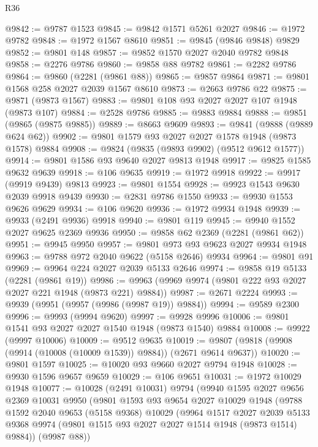 \begin{lexlean}{R36}
\begin{coremodule}
@9842 := @9787 @1523
@9845 := @9842 @1571 @5261 @2027
@9846 := @1972 @9782
@9848 := @1972 @1567 @8610
@9851 := @9845 (@9846 @9848) @9829
@9852 := @9801 @148
@9857 := @9852 @1570 @2027 @2040 @9782 @9848
@9858 := @2276 @9786
@9860 := @9858 @88 @9782
@9861 := @2282 @9786
@9864 := @9860 (@2281 (@9861 @88))
@9865 := @9857 @9864
@9871 := @9801 @1568 @258 @2027 @2039 @1567 @8610
@9873 := @2663 @9786 @22
@9875 := @9871 (@9873 @1567)
@9883 := @9801 @108 @93 @2027 @2027 @107 @1948 (@9873 @107)
@9884 := @2528 @9786
@9885 := @9883 @9884
@9888 := @9851 (@9865 (@9875 @9885))
@9889 := @8663 @9609
@9893 := @9841 (@9888 (@9889 @624 @62))
@9902 := @9801 @1579 @93 @2027 @2027 @1578 @1948 (@9873 @1578) @9884
@9908 := @9824 (@9835 (@9893 @9902) (@9512 @9612 @1577))
@9914 := @9801 @1586 @93 @9640 @2027 @9813 @1948
@9917 := @9825 @1585 @9632 @9639
@9918 := @106 @9635
@9919 := @1972 @9918
@9922 := @9917 (@9919 @9439) @9813
@9923 := @9801 @1554
@9928 := @9923 @1543 @9630 @2039 @9918 @9439
@9930 := @2831 @9786 @1550
@9933 := @9930 @1553 @9626 @9629
@9934 := @106 @9620
@9936 := @1972 @9934 @1948
@9939 := @9933 (@2491 @9936) @9918
@9940 := @9801 @119
@9945 := @9940 @1552 @2027 @9625 @2369 @9936
@9950 := @9858 @62 @2369 (@2281 (@9861 @62))
@9951 := @9945 @9950
@9957 := @9801 @973 @93 @9623 @2027 @9934 @1948
@9963 := @9788 @972 @2040 @9622 (@5158 @2646) @9934
@9964 := @9801 @91
@9969 := @9964 @224 @2027 @2039 @5133 @2646
@9974 := @9858 @19 @5133 (@2281 (@9861 @19))
@9986 := @9963 (@9969 @9974 (@9801 @222 @93 @2027 @2027 @221 @1948 (@9873 @221) @9884))
@9987 := @2671 @2224
@9993 := @9939 (@9951 (@9957 (@9986 (@9987 @19)) @9884))
@9994 := @9589 @2300
@9996 := @9993 (@9994 @9620)
@9997 := @9928 @9996
@10006 := @9801 @1541 @93 @2027 @2027 @1540 @1948 (@9873 @1540) @9884
@10008 := @9922 (@9997 @10006)
@10009 := @9512 @9635
@10019 := @9807 (@9818 (@9908 (@9914 (@10008 (@10009 @1539)) @9884)) (@2671 @9614 @9637))
@10020 := @9801 @1597
@10025 := @10020 @93 @9660 @2027 @9794 @1948
@10028 := @9930 @1596 @9657 @9659
@10029 := @106 @9651
@10031 := @1972 @10029 @1948
@10077 := @10028
    (@2491 @10031)
    @9794
    (@9940
      @1595
      @2027
      @9656
      @2369
      @10031
      @9950
      (@9801
        @1593
        @93
        @9654
        @2027
        @10029
        @1948
        (@9788
          @1592
          @2040
          @9653
          (@5158 @9368)
          @10029
          (@9964
            @1517
            @2027
            @2039
            @5133
            @9368
            @9974
            (@9801 @1515 @93 @2027 @2027 @1514 @1948 (@9873 @1514) @9884))
          (@9987 @88))

\end{coremodule}
\end{lexlean}
